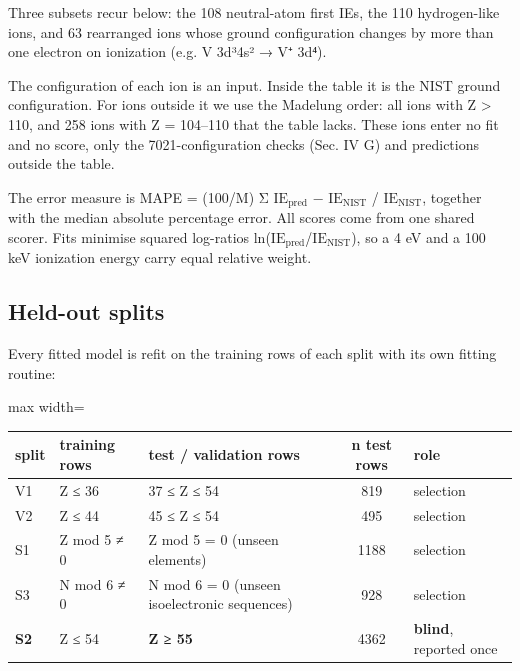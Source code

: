 \documentclass[aps,pra,preprint,notitlepage,superscriptaddress,amsmath,amssymb]{revtex4-2}
\begin{document}
Three subsets recur below: the 108 neutral-atom first IEs, the 110 hydrogen-like ions, and 63 rearranged ions whose ground configuration changes by more than one electron on ionization (e.g. V 3d³4s² → V⁺ 3d⁴).


The configuration of each ion is an input. Inside the table it is the NIST ground configuration. For ions outside it we use the Madelung order: all ions with Z > 110, and 258 ions with Z = 104–110 that the table lacks. These ions enter no fit and no score, only the 7021-configuration checks (Sec. IV G) and predictions outside the table.


The error measure is MAPE = (100/M) Σ \textbar{}$\mathrm{IE}_{\mathrm{pred}}$ − $\mathrm{IE}_{\mathrm{NIST}}$\textbar{} / $\mathrm{IE}_{\mathrm{NIST}}$, together with the median absolute percentage error. All scores come from one shared scorer. Fits minimise squared log-ratios ln($\mathrm{IE}_{\mathrm{pred}}$/$\mathrm{IE}_{\mathrm{NIST}}$), so a 4 eV and a 100 keV ionization energy carry equal relative weight.


\subsection{Held-out splits}

Every fitted model is refit on the training rows of each split with its own fitting routine:


\begin{table}[h]
\footnotesize\linespread{1}\selectfont\setlength{\tabcolsep}{5pt}\renewcommand{\arraystretch}{1.1}
\begin{adjustbox}{max width=\linewidth}
\begin{tabular}{lllcl}
\hline\hline
split & training rows & test / validation rows & n test rows & role \\
\hline
V1 & Z ≤ 36 & 37 ≤ Z ≤ 54 & 819 & selection \\
V2 & Z ≤ 44 & 45 ≤ Z ≤ 54 & 495 & selection \\
S1 & Z mod 5 ≠ 0 & Z mod 5 = 0 (unseen elements) & 1188 & selection \\
S3 & N mod 6 ≠ 0 & N mod 6 = 0 (unseen isoelectronic sequences) & 928 & selection \\
\textbf{S2} & Z ≤ 54 & \textbf{Z ≥ 55} & 4362 & \textbf{blind}, reported once \\
\hline\hline
\end{tabular}
\end{adjustbox}
\end{table}
\end{document}
